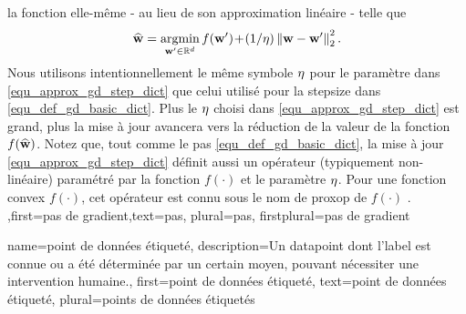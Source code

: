 {{		la fonction elle-même - au lieu de son approximation linéaire - telle que
		\begin{align} 
			\label{equ_approx_gd_step_dict}
			\widehat{{\bf w}} = \operatorname*{argmin}_{{\bf w}' \in \mathbb{R}^{d}} f({\bf w}')\!+\!(1/\eta)\left\Vert {{\bf w}-{\bf w}'} \right\Vert_{2}^2. 
		\end{align}
		Nous utilisons intentionnellement le même symbole $\eta$ pour le paramètre dans \eqref{equ_approx_gd_step_dict} 
		que celui utilisé pour la \gls{stepsize} dans \eqref{equ_def_gd_basic_dict}. Plus le $\eta$ choisi dans 
		\eqref{equ_approx_gd_step_dict} est grand, plus la mise à jour avancera vers la réduction de la 
		valeur de la fonction $f(\widehat{{\bf w}})$. Notez que, tout comme le pas \eqref{equ_def_gd_basic_dict}, 
		la mise à jour \eqref{equ_approx_gd_step_dict} définit aussi un opérateur (typiquement non-linéaire) 
		paramétré par la fonction $f(\cdot)$ et le paramètre $\eta$. Pour une fonction \gls{convex} 
		$f(\cdot)$, cet opérateur est connu sous le nom de \gls{proxop} de $f(\cdot)$ \cite{ProximalMethods}. 
	},first={pas de gradient},text={pas}, plural={pas}, firstplural={pas de gradient}}

 
 {
 	name={point de données étiqueté},
 	description={Un \gls{datapoint} dont l'\gls{label} est connue ou a été déterminée 
 		par un certain moyen, pouvant nécessiter une intervention humaine.},
 	first={point de données étiqueté},
 	text={point de données étiqueté}, plural={points de données étiquetés}  
 }

